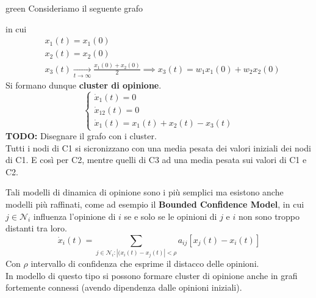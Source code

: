 \begin{mybox}[breakable]{green}{}
Consideriamo il seguente grafo
\begin{center}
\end{center}
in cui 
\begin{equation}
    \begin{aligned}
    &x_1(t)=x_1(0) \\
    &x_2(t)=x_2(0) \\
    &x_3(t) \underset{t \to \infty}{\rightarrow} \frac{x_1(0)+x_2(0)}{2} \implies x_3(t) = w_1 x_1(0)+w_2 x_2(0)
    \end{aligned}
\end{equation}
Si formano dunque \textbf{cluster di opinione}.
\begin{equation}
    \begin{cases}
    \dot{x}_1(t)=0 \\
    \dot{x}_12(t)=0 \\
    \dot{x}_1(t)= x_1(t) + x_2(t) - x_3(t)
    \end{cases}
\end{equation}
\textbf{TODO:} Disegnare il grafo con i cluster.\\
Tutti i nodi di C1 si sicronizzano con una media pesata dei valori iniziali dei nodi di C1. E così per C2, mentre quelli di C3 ad una media pesata sui valori di C1 e C2.\\
\end{mybox}
Tali modelli di dinamica di opinione sono i più semplici ma esistono anche modelli più raffinati, come ad esempio il \textbf{Bounded Confidence Model}, in cui $j \in \mathcal{N}_i$ influenza l'opinione  di $i$ se e solo se le opinioni di $j$ e $i$ non sono troppo distanti tra loro.
\begin{equation}
    \dot{x}_i(t) = \sum_{j \in \mathcal{N}_i:|(x_i(t)-x_j(t)|<\rho}  a_{ij} [x_j(t) - x_i(t)]
\end{equation}
Con $\rho$ intervallo di confidenza che esprime il distacco delle opinioni.\\
In modello di questo tipo si possono formare cluster di opinione anche in grafi fortemente connessi (avendo dipendenza dalle opinioni iniziali).
